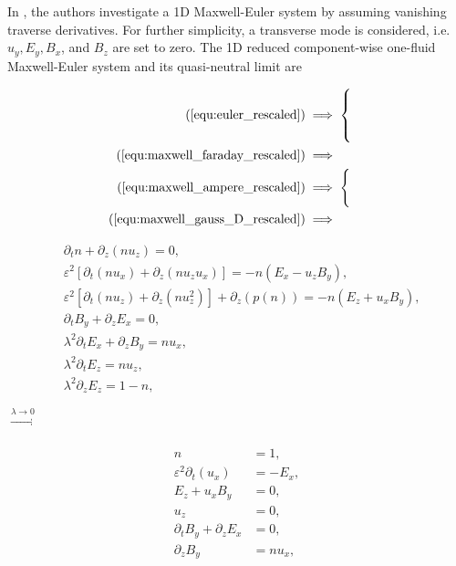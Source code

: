 \documentclass{article}
\begin{document}
In \cite{degond_2012}, the authors investigate a 1D Maxwell-Euler system by assuming
vanishing traverse derivatives. For further simplicity, a transverse mode is considered,
i.e. $u_y, E_y, B_x$, and $B_z$ are set to zero.  The 1D reduced component-wise one-fluid
Maxwell-Euler system and its quasi-neutral limit are

\vspace{-0.3cm}
\begin{minipage}{0.07\textwidth}
    \begin{align*}
        (\ref{equ:euler_rescaled})&\implies
        \begin{cases}
            \\
            \\
            \\
        \end{cases} \\
        (\ref{equ:maxwell_faraday_rescaled}) &\implies \\
        (\ref{equ:maxwell_ampere_rescaled})  &\implies 
        \begin{cases}
            \\
            \\
        \end{cases} \\
        (\ref{equ:maxwell_gauss_D_rescaled}) & \implies
    \end{align*}    
\end{minipage}
\begin{minipage}{0.4\textwidth}
    \begin{align*}
        &\partial_t n + \partial_z(nu_z) = 0, \\
        &\varepsilon^2[\partial_t(nu_x) + \partial_z(nu_zu_x)] = - n(E_x - u_zB_y), \\
        &\varepsilon^2[\partial_t(nu_z) + \partial_z(nu_z^2)] + \partial_z(p(n)) = -n(E_z + u_xB_y), \\
        &\partial_t B_y + \partial_z E_x = 0, \\
        &\lambda^2 \partial_t E_x + \partial_z B_y = nu_x, \\
        &\lambda^2 \partial_t E_z = nu_z, \\
        &\lambda^2 \partial_z E_z = 1 - n,
    \end{align*}
\end{minipage}
\hspace{0.5cm}$\xrightarrow[]{\lambda \rightarrow 0}$
\begin{minipage}{0.3\textwidth}
    \begin{align*}
        n &= 1,\\
        \varepsilon^2 \partial_t(u_x) &= - E_x, \\
        E_z + u_xB_y &= 0, \\
        u_z &= 0, \\
        \partial_t B_y + \partial_z E_x &= 0, \\
        \partial_z B_y &= nu_x,
    \end{align*}
\end{minipage}
\end{document}
